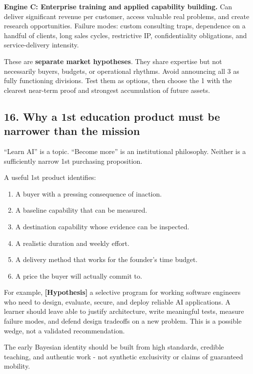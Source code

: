 \textbf{Engine C: Enterprise training and applied capability building.} Can deliver significant revenue per customer, access valuable real problems, and create research opportunities. Failure modes: custom consulting traps, dependence on a handful of clients, long sales cycles, restrictive IP, confidentiality obligations, and service-delivery intensity.

These are \textbf{separate market hypotheses}. They share expertise but not necessarily buyers, budgets, or operational rhythms. Avoid announcing all 3 as fully functioning divisions. Test them as options, then choose the 1 with the clearest near-term proof and strongest accumulation of future assets.

\subsection{16. Why a 1st education product must be narrower than the mission}

``Learn AI'' is a topic. ``Become more'' is an institutional philosophy. Neither is a sufficiently narrow 1st purchasing proposition.

A useful 1st product identifies:

\begin{enumerate}[leftmargin=*,itemsep=1.5pt]
  \item A buyer with a pressing consequence of inaction.
  \item A baseline capability that can be measured.
  \item A destination capability whose evidence can be inspected.
  \item A realistic duration and weekly effort.
  \item A delivery method that works for the founder's time budget.
  \item A price the buyer will actually commit to.
\end{enumerate}

For example, \textbf{\textbf{[Hypothesis]}} a selective program for working software engineers who need to design, evaluate, secure, and deploy reliable AI applications. A learner should leave able to justify architecture, write meaningful tests, measure failure modes, and defend design tradeoffs on a new problem. This is a possible wedge, not a validated recommendation.

The early Bayesian identity should be built from high standards, credible teaching, and authentic work - not synthetic exclusivity or claims of guaranteed mobility.

